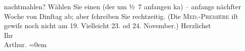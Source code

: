 \begin{ledgroupsized}[t]{13cm}
               nachtmahlen? Wählen Sie einen \label{K_L01979_1v}\label{K_L01979_1h} (der um ½ 7 anfangen ka{\geminationn}) – anfangs nächſter Woche von Dinſtag ab;
               aber ſchreiben Sie rechtzeitig. (Die \textsc{Med.-Première} iſt gewiſs noch nicht am 19.
               Vielleicht 23. od 24. November.)\pend
           \pstart
           Herzlichst{\\[\baselineskip]}Ihr{\\[\baselineskip]}\spacefill\mbox{Arthur.}\pend
           \leftskip=0em{}
         
         \endnumbering{}\end{ledgroupsized}  \newcommand{\dateiname}{L01979}\newcommand{\titel}{Arthur Schnitzler an Hugo von Hofmannsthal, 10. 11. 1910}\newcommand{\editorInnen}{Martin Anton Müller und Gerd-Hermann Susen}
      